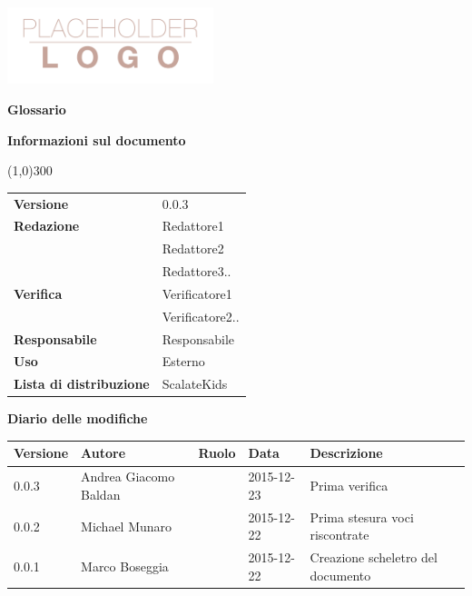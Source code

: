 \documentclass{scalatekids-article}
\begin{document}
\begin{titlepage}
  \centering
  \includegraphics[width=0.45\textwidth]{img/logo.png}\par\vspace{1cm}
  \vspace{1.5cm}
         {\Huge\bfseries Glossario \par}
         \begin{center}
           \vspace{1.0cm}
                  {\large\bfseries Informazioni sul documento \par}
         \end{center}
         \vspace{-1cm}
         \begin{center}
           \line(1,0){300}
         \end{center}
         \vspace{0cm}
         \begin{tabular}[c]{l|l}
           \textbf{Versione} & 0.0.3\\
           \textbf{Redazione} & Redattore1\\ & Redattore2\\ & Redattore3..\\
           \textbf{Verifica} & Verificatore1\\ & Verificatore2..\\
           \textbf{Responsabile} & Responsabile\\
           \textbf{Uso} & Esterno\\
           \textbf{Lista di distribuzione} & ScalateKids
         \end{tabular}
\end{titlepage}
\clearpage
\setcounter{page}{1}
\begin{flushleft}
  \vspace{0cm}
         {\large\bfseries Diario delle modifiche \par}
\end{flushleft}
\vspace{0cm}
\begin{center}
  \begin{tabular}{|l | l | l | l | l |}
    \hline
    Versione & Autore & Ruolo & Data & Descrizione \\
    \hline
    0.0.3 & Andrea Giacomo Baldan & & 2015-12-23 & Prima verifica\\
    \hline
    0.0.2 & Michael Munaro & & 2015-12-22 & Prima stesura voci riscontrate\\
    \hline
    0.0.1 & Marco Boseggia & & 2015-12-22 & Creazione scheletro del documento\\
    \hline
  \end{tabular}
\end{center}
\end{document}
